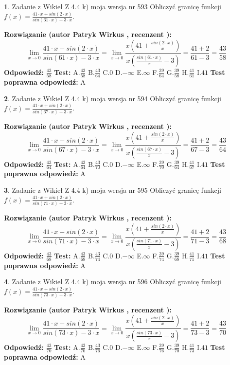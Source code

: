 \documentclass[12pt, a4paper]{article}
\theoremstyle{definition} %
\newtheorem{zad}{}
\newcommand{\zadStart}[1]{\begin{zad}#1\newline}
\newcommand{\zadStop}{\end{zad}}
\newcommand{\rozwStart}[2]{\noindent \textbf{Rozwiązanie (autor #1 , recenzent #2): }\newline}
\newcommand{\rozwStop}{\newline}
\newcommand{\odpStart}{\noindent \textbf{Odpowiedź:}\newline}
\newcommand{\odpStop}{\newline}
\newcommand{\testStart}{\noindent \textbf{Test:}\newline}
\newcommand{\testStop}{\newline}
\newcommand{\kluczStart}{\noindent \textbf{Test poprawna odpowiedź:}\newline}
\newcommand{\kluczStop}{\newline}
\begin{document}
\zadStart{Zadanie z Wikieł Z 4.4 k) moja wersja nr 593}
Obliczyć granicę funkcji $f(x)=\frac{41\cdot x +sin(2\cdot x)}{sin(61\cdot x) -3\cdot x}$.
\zadStop
\rozwStart{Patryk Wirkus}{}
$$\lim\limits_{x\to 0}\frac{41\cdot x +sin(2\cdot x)}{sin(61\cdot x) -3\cdot x}
=\lim\limits_{x\to 0}\frac{x(41+\frac{sin(2\cdot x)}{x})}{x(\frac{sin(61\cdot x)}{x}-3)}
=\frac{41+2}{61-3} = \frac{43}{58}$$
\rozwStop
\odpStart
$\frac{43}{58}$
\odpStop
\testStart
A.$\frac{43}{58}$
B.$\frac{43}{64}$
C.$0$
D.$-\infty$
E.$\infty$
F.$\frac{39}{64}$
G.$\frac{39}{58}$
H.$\frac{41}{61}$
I.$41$
\testStop
\kluczStart
A
\kluczStop



\zadStart{Zadanie z Wikieł Z 4.4 k) moja wersja nr 594}
Obliczyć granicę funkcji $f(x)=\frac{41\cdot x +sin(2\cdot x)}{sin(67\cdot x) -3\cdot x}$.
\zadStop
\rozwStart{Patryk Wirkus}{}
$$\lim\limits_{x\to 0}\frac{41\cdot x +sin(2\cdot x)}{sin(67\cdot x) -3\cdot x}
=\lim\limits_{x\to 0}\frac{x(41+\frac{sin(2\cdot x)}{x})}{x(\frac{sin(67\cdot x)}{x}-3)}
=\frac{41+2}{67-3} = \frac{43}{64}$$
\rozwStop
\odpStart
$\frac{43}{64}$
\odpStop
\testStart
A.$\frac{43}{64}$
B.$\frac{43}{70}$
C.$0$
D.$-\infty$
E.$\infty$
F.$\frac{39}{70}$
G.$\frac{39}{64}$
H.$\frac{41}{67}$
I.$41$
\testStop
\kluczStart
A
\kluczStop



\zadStart{Zadanie z Wikieł Z 4.4 k) moja wersja nr 595}
Obliczyć granicę funkcji $f(x)=\frac{41\cdot x +sin(2\cdot x)}{sin(71\cdot x) -3\cdot x}$.
\zadStop
\rozwStart{Patryk Wirkus}{}
$$\lim\limits_{x\to 0}\frac{41\cdot x +sin(2\cdot x)}{sin(71\cdot x) -3\cdot x}
=\lim\limits_{x\to 0}\frac{x(41+\frac{sin(2\cdot x)}{x})}{x(\frac{sin(71\cdot x)}{x}-3)}
=\frac{41+2}{71-3} = \frac{43}{68}$$
\rozwStop
\odpStart
$\frac{43}{68}$
\odpStop
\testStart
A.$\frac{43}{68}$
B.$\frac{43}{74}$
C.$0$
D.$-\infty$
E.$\infty$
F.$\frac{39}{74}$
G.$\frac{39}{68}$
H.$\frac{41}{71}$
I.$41$
\testStop
\kluczStart
A
\kluczStop



\zadStart{Zadanie z Wikieł Z 4.4 k) moja wersja nr 596}
Obliczyć granicę funkcji $f(x)=\frac{41\cdot x +sin(2\cdot x)}{sin(73\cdot x) -3\cdot x}$.
\zadStop
\rozwStart{Patryk Wirkus}{}
$$\lim\limits_{x\to 0}\frac{41\cdot x +sin(2\cdot x)}{sin(73\cdot x) -3\cdot x}
=\lim\limits_{x\to 0}\frac{x(41+\frac{sin(2\cdot x)}{x})}{x(\frac{sin(73\cdot x)}{x}-3)}
=\frac{41+2}{73-3} = \frac{43}{70}$$
\rozwStop
\odpStart
$\frac{43}{70}$
\odpStop
\testStart
A.$\frac{43}{70}$
B.$\frac{43}{76}$
C.$0$
D.$-\infty$
E.$\infty$
F.$\frac{39}{76}$
G.$\frac{39}{70}$
H.$\frac{41}{73}$
I.$41$
\testStop
\kluczStart
A
\kluczStop
\end{document}
